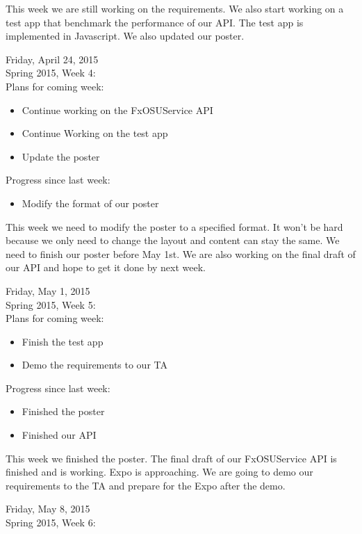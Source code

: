 This week we are still working on the requirements. We also start working on a test app that benchmark the performance of our API. The test app is implemented in Javascript. We also updated our poster.

Friday, April 24, 2015 \\
Spring 2015, Week 4: \\

Plans for coming week:
\begin{itemize}
\item Continue working on the FxOSUService API
\item Continue Working on the test app
\item Update the poster
\end{itemize}

Progress since last week:
\begin{itemize}
\item Modify the format of our poster
\end{itemize}

This week we need to modify the poster to a specified format. It won't be hard because we only need to change the layout and content can stay the same. We need to finish our poster before May 1st. We are also working on the final draft of our API and hope to get it done by next week.

Friday, May 1, 2015 \\
Spring 2015, Week 5: \\

Plans for coming week:
\begin{itemize}
\item Finish the test app
\item Demo the requirements to our TA
\end{itemize}

Progress since last week:
\begin{itemize}
\item Finished the poster
\item Finished our API
\end{itemize}

This week we finished the poster. The final draft of our FxOSUService API is finished and is working. Expo is approaching. We are going to demo our requirements to the TA and prepare for the Expo after the demo.

Friday, May 8, 2015 \\
Spring 2015, Week 6: \\

